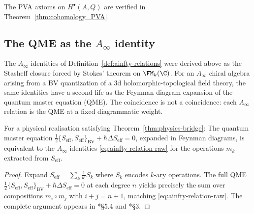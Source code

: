 The PVA axioms on $H^\bullet(A, Q)$ are verified in
Theorem~\ref{thm:cohomology_PVA}.

\subsection{The QME as the $A_\infty$ identity}
\label{subsec:qme-ainfty}

The $A_\infty$ identities of Definition~\ref{def:ainfty-relations} were derived above as the Stasheff closure forced by Stokes' theorem on $\FM_k(\C)$. For an $A_\infty$ chiral algebra arising from a BV quantization of a 3d holomorphic-topological field theory, the same identities have a second life as the Feynman-diagram expansion of the quantum master equation (QME). The coincidence is not a coincidence: each $A_\infty$ relation is the QME at a fixed diagrammatic weight.

\begin{lemma}
\label{lem:QME_to_Ainfty}
For a physical realisation satisfying Theorem~\ref{thm:physics-bridge}:
The quantum master equation $\frac{1}{2}\{S_{\mathrm{eff}},S_{\mathrm{eff}}\}_{\mathrm{BV}} + \hbar\Delta S_{\mathrm{eff}}=0$, expanded in Feynman diagrams, is equivalent to the $A_\infty$ identities \eqref{eq:ainfty-relation-raw} for the operations $m_k$ extracted from $S_{\mathrm{eff}}$.
\end{lemma}

\begin{proof}
Expand $S_{\mathrm{eff}} = \sum_k \frac{1}{k!} S_k$ where $S_k$ encodes $k$-ary operations. The full QME $\tfrac{1}{2}\{S_{\mathrm{eff}},S_{\mathrm{eff}}\}_{\mathrm{BV}} + \hbar\Delta S_{\mathrm{eff}} = 0$ at each degree $n$ yields precisely the sum over compositions $m_i \circ m_j$ with $i+j=n+1$, matching \eqref{eq:ainfty-relation-raw}. The complete argument appears in \cite{CG17}*{\S5.4} and \cite{CDG20}*{\S3}.
\end{proof}

